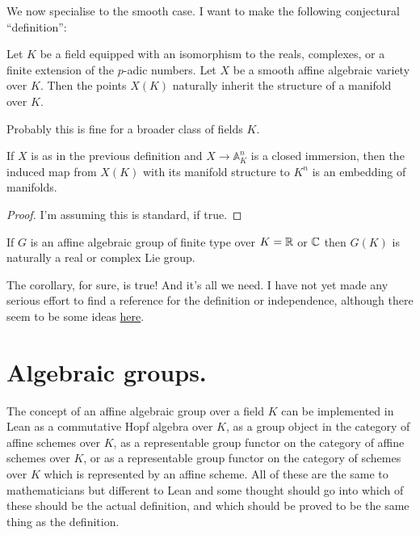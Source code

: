 We now specialise to the smooth case. I want to make the following conjectural ``definition'':
    
\begin{definition}\label{manifold_on_algebraic_variety_points} Let $K$ be a field equipped with an isomorphism to the reals, complexes, or a finite extension of the $p$-adic numbers. Let $X$ be a smooth affine algebraic variety over $K$. Then the points $X(K)$ naturally inherit the structure of a manifold over $K$.
\end{definition}

\begin{remark} Probably this is fine for a broader class of fields $K$. 
\end{remark}

\begin{theorem}\label{manifold_on_algebraic_variety_computation} 
    If $X$ is as in the previous definition and $X\to\mathbb{A}^n_K$ is a closed immersion, then the induced map from $X(K)$ with its manifold structure to $K^n$ is an embedding of manifolds. 
\end{theorem}
\begin{proof} I'm assuming this is standard, if true. 
\end{proof}
\begin{corollary}\label{lie_group_from_algebraic_group}
    If $G$ is an affine algebraic group of finite type over $K=\mathbb{R}$ or ${\mathbb{C}}$ then $G(K)$ is naturally a real or complex Lie group.
\end{corollary}
\begin{remark}

    The corollary, for sure, is true! And it's all we need. I have not yet made any serious effort to find a reference for the definition or independence, although there seem to be some ideas \href{https://leanprover.zulipchat.com/#narrow/stream/116395-maths/topic/top.20space.20.2F.20manifold.20structure.20on.20points.20of.20alg.20varieties/near/431812525}{here}.
\end{remark}
\section{Algebraic groups.}

The concept of an affine algebraic group over a field $K$ can be implemented in Lean as a commutative Hopf algebra over $K$, as a group object in the category of affine schemes over $K$, as a representable group functor on the category of affine schemes over $K$, or as a representable group functor on the category of schemes over $K$ which is represented by an affine scheme. All of these are the same to mathematicians but different to Lean and some thought should go into which of these should be the actual definition, and which should be proved to be the same thing as the definition.

